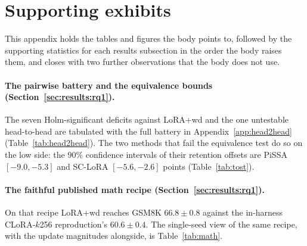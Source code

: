 \documentclass[11pt]{article}
\begin{document}


\section{Supporting exhibits}\label{app:exhibits}
This appendix holds the tables and figures the body points to, followed by the
supporting statistics for each results subsection in the order the body raises
them, and closes with two further observations that the body does not use.











\paragraph{The pairwise battery and the equivalence bounds
(Section~\ref{sec:results:rq1}).} The seven Holm-significant deficits against
LoRA{+}wd and the one untestable head-to-head are tabulated with the full
battery in Appendix~\ref{app:head2head} (Table~\ref{tab:head2head}). The two
methods that fail the equivalence test do so on the low side: the $90\%$
confidence intervals of their retention offsets are PiSSA $[-9.0, -5.3]$ and
SC-LoRA $[-5.6, -2.6]$ points (Table~\ref{tab:tost}).

\paragraph{The faithful published math recipe
(Section~\ref{sec:results:rq1}).} On that recipe LoRA{+}wd reaches GSM8K
$66.8\!\pm\!0.8$ against the in-harness CLoRA-$k$256 reproduction's
$60.6\!\pm\!0.4$. The single-seed view of the same recipe, with the update
magnitudes alongside, is Table~\ref{tab:math}.
\end{document}
